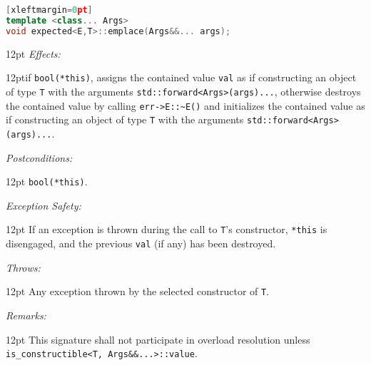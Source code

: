 \documentclass[a4paper,10pt]{article}
\newcommand{\cpp}[1]{\lstinline{#1}}
\newcommand{\wordingItem}[1]{\noindent\textit{#1:}}
\newenvironment{wordingTextItem}[1]{\wordingItem{#1}\vspace{2pt}\noindent\begin{adjustwidth}{12pt}{}}{\vspace{2pt}\end{adjustwidth}}
\newenvironment{wordingPara}{\begin{adjustwidth}{12pt}{}}{\end{adjustwidth}}
\begin{document}
\begin{lstlisting}[language=C++][xleftmargin=0pt]
template <class... Args>
void expected<E,T>::emplace(Args&&... args); 
\end{lstlisting}
\begin{wordingPara}
\begin{wordingTextItem}{Effects}if \cpp{bool(*this)}, assigns the contained value \cpp{val} as if constructing an object of type \cpp{T} with the arguments \cpp{std::forward<Args>(args)...}, otherwise destroys the contained value by calling \cpp{err->E::~E()} and  initializes the contained value as if constructing an object of type \cpp{T} with the arguments \cpp{std::forward<Args>(args)...}.
\end{wordingTextItem}
\begin{wordingTextItem}{Postconditions}
\cpp{bool(*this)}.
\end{wordingTextItem}
\begin{wordingTextItem}{Exception Safety}
If an exception is thrown during the call to \cpp{T}'s constructor, \cpp{*this} is disengaged, and the previous \cpp{val} (if any) has been destroyed.
\end{wordingTextItem}
\begin{wordingTextItem}{Throws}
Any exception thrown by the selected constructor of \cpp{T}.
\end{wordingTextItem}
\begin{wordingTextItem}{Remarks}
This signature shall not participate in overload resolution unless\\
\cpp{is_constructible<T, Args&&...>::value}.
\end{wordingTextItem}
\end{wordingPara}
\end{document}
